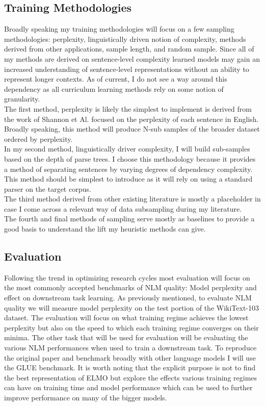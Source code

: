 \documentclass[11pt,a4paper]{article}
\begin{document}
\subsection{Training Methodologies}
Broadly speaking my training methodologies will focus on a few sampling methodologies: perplexity, linguistically driven notion of complexity, methods derived from other applications, sample length, and random sample. Since all of my methods are derived on sentence-level complexity learned models may gain an increased understanding of sentence-level representations without an ability to represent longer contexts. As of current, I do not see a way around this dependency as all curriculum learning methods rely on some notion of granularity.\\ The first method, perplexity is likely the simplest to implement is derived from the work of Shannon et Al. \cite{Shannon1951PredictionAE} focused on the perplexity of each sentence in English. Broadly speaking, this method will produce N-sub samples of the broader dataset ordered by perplexity. \\
In my second method, linguistically driver complexity, I will build sub-samples based on the depth of parse trees. I choose this methodology because it provides a method of separating sentences by varying degrees of dependency complexity. This method should be simplest to introduce as it will rely on using a standard parser on the target corpus.\\
The third method derived from other existing literature is mostly a placeholder in case I come across a relevant way of data subsampling during my literature. \\
The fourth and final methods of sampling serve mostly as baselines to provide a good basis to understand the lift my heuristic methods can give. 
\subsection{Evaluation}
Following the trend in optimizing research cycles most evaluation will focus on the most commonly accepted benchmarks of NLM quality: Model perplexity and effect on downstream task learning. As previously mentioned, to evaluate NLM quality we will measure model perplexity on the test portion of the WikiText-103 dataset. The evaluation will focus on what training regime achieves the lowest perplexity but also on the speed to which each training regime converges on their minima. The other task that will be used for evaluation will be evaluating the various NLM performances when used to train a downstream task. To reproduce the original paper and benchmark broadly with other language models I will use the GLUE \cite{Wang2018GLUEAM} benchmark. It is worth noting that the explicit purpose is not to find the best representation of ELMO but explore the effects various training regimes can have on training time and model performance which can be used to further improve performance on many of the bigger models. 
\end{document}
